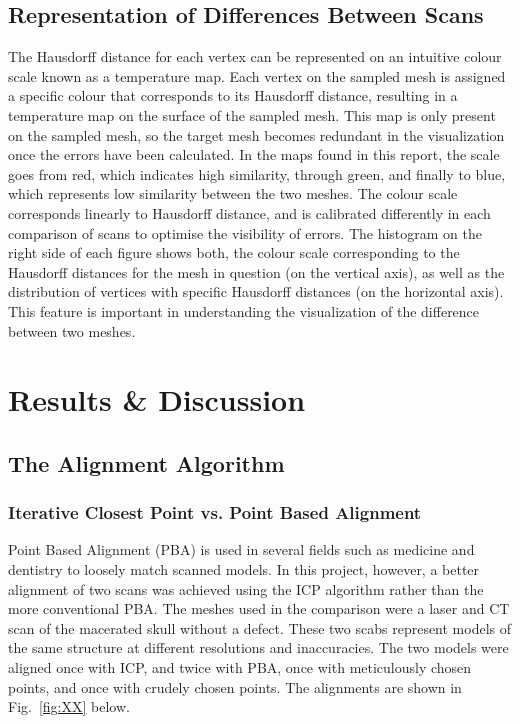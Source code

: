 \documentclass[a4paper]{article}
\begin{document}
\subsection{Representation of Differences Between Scans} %
The Hausdorff distance for each vertex can be represented on an intuitive colour scale known as a temperature map. Each vertex on the sampled mesh is assigned a specific colour that corresponds to its Hausdorff distance, resulting in a temperature map on the surface of the sampled mesh. This map is only present on the sampled mesh, so the target mesh becomes redundant in the visualization once the errors have been calculated. In the maps found in this report, the scale goes from red, which indicates high similarity, through green, and finally to blue, which represents low similarity between the two meshes. The colour scale corresponds linearly to Hausdorff distance, and is calibrated differently in each comparison of scans to optimise the visibility of errors. The histogram on the right side of each figure shows both, the colour scale corresponding to the Hausdorff distances for the mesh in question (on the vertical axis), as well as the distribution of vertices with specific Hausdorff distances (on the horizontal axis). This feature is important in understanding the visualization of the difference between two meshes. 


\section{Results \& Discussion} %

\subsection{The Alignment Algorithm} %

\subsubsection{Iterative Closest Point vs. Point Based Alignment}

Point Based Alignment (PBA) is used in several fields such as medicine and dentistry to loosely match scanned models. In this project, however, a better alignment of two scans was achieved using the ICP algorithm rather than the more conventional PBA. The meshes used in the comparison were a laser and CT scan of the macerated skull without a defect. These two scabs represent models of the same structure at different resolutions and inaccuracies. The two models were  aligned once with ICP, and twice with PBA, once with meticulously chosen points, and once with crudely chosen points.
The alignments are shown in Fig.~\ref{fig:XX} below.
\end{document}
